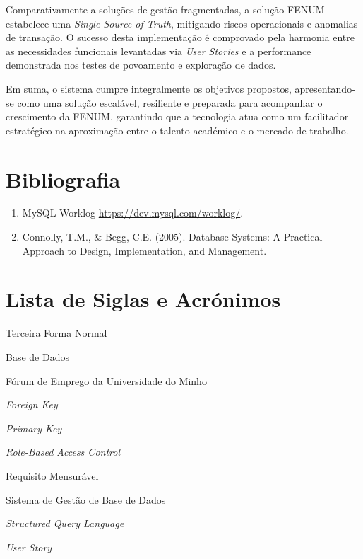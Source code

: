 \documentclass[12pt,a4paper]{article}
\begin{document}
Comparativamente a soluções de gestão fragmentadas, a solução FENUM estabelece uma \textit{Single Source of Truth}, mitigando riscos operacionais e anomalias de transação. O sucesso desta implementação é comprovado pela harmonia entre as necessidades funcionais levantadas via \textit{User Stories} e a performance demonstrada nos testes de povoamento e exploração de dados.

Em suma, o sistema cumpre integralmente os objetivos propostos, apresentando-se como uma solução escalável, resiliente e preparada para acompanhar o crescimento da FENUM, garantindo que a tecnologia atua como um facilitador estratégico na aproximação entre o talento académico e o mercado de trabalho.

\newpage
\section*{Bibliografia}

\begin{enumerate}
    \item MySQL Worklog \url{https://dev.mysql.com/worklog/}.
    \item Connolly, T.M., \& Begg, C.E. (2005). Database Systems: A Practical Approach to Design, Implementation, and Management.
\end{enumerate}
\newpage
\section*{Lista de Siglas e Acrónimos}

\begin{description}[leftmargin=3cm, style=nextline]
    \item[3FN] Terceira Forma Normal
    \item[BD] Base de Dados
    \item[FENUM] Fórum de Emprego da Universidade do Minho
    \item[FK] \textit{Foreign Key}
    \item[PK] \textit{Primary Key} 
    \item[RBAC] \textit{Role-Based Access Control}
    \item[RM] Requisito Mensurável
    \item[SGBD] Sistema de Gestão de Base de Dados
    \item[SQL] \textit{Structured Query Language}
    \item[US] \textit{User Story} 
\end{description}
\end{document}
